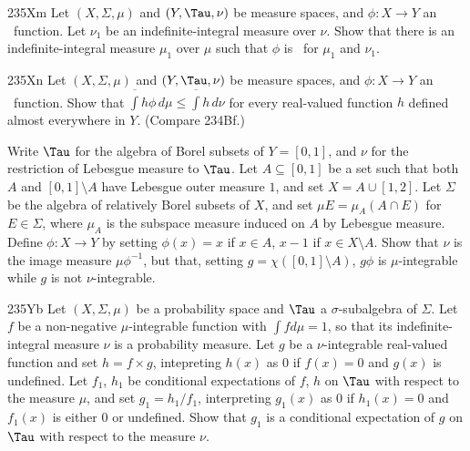 {\spheader 235Xm
 Let $(X,\Sigma,\mu)$ and $(Y,\Tau,\nu)$ be measure spaces,  
and $\phi:X\to Y$ an \imp\ function.   Let $\nu_1$ be an 
indefinite-integral measure over $\nu$.   Show that there is an 
indefinite-integral measure $\mu_1$ over $\mu$ such that $\phi$ is \imp\  
for $\mu_1$ and $\nu_1$. 

\spheader 235Xn  
Let $(X,\Sigma,\mu)$ and $(Y,\Tau,\nu)$ be 
measure spaces, and $\phi:X\to Y$ an \imp\ function.   Show that
$\overline{\int}h\phi\,d\mu\le\overline{\int}h\,d\nu$ for every
real-valued function $h$ defined almost everywhere in $Y$.
(Compare 234Bf.)

Write $\Tau$ for the algebra of Borel subsets of
$Y=[0,1]$, and $\nu$ for the restriction of Lebesgue measure to $\Tau$.
Let $A\subseteq[0,1]$ be a set such that both $A$ and $[0,1]\setminus A$
have Lebesgue outer measure $1$, and set $X=A\cup[1,2]$.   Let $\Sigma$
be the algebra of relatively Borel subsets of $X$, and set 
$\mu E=\mu_A(A\cap E)$ for $E\in\Sigma$, where $\mu_A$ is the subspace
measure induced on $A$ by Lebesgue measure.   Define $\phi:X\to Y$ by
setting $\phi(x)=x$ if $x\in A$, $x-1$ if $x\in X\setminus A$.   Show
that $\nu$ is the image measure $\mu\phi^{-1}$, but that,
setting $g=\chi([0,1]\setminus A)$, $g\phi$ is $\mu$-integrable while
$g$ is not $\nu$-integrable.

\spheader 235Yb Let $(X,\Sigma,\mu)$ be a probability space and $\Tau$ a
$\sigma$-subalgebra of $\Sigma$.   Let $f$ be a non-negative
$\mu$-integrable function with $\int fd\mu=1$, so that its
indefinite-integral measure $\nu$ is a probability measure.   Let $g$ be
a $\nu$-integrable real-valued function and set $h=f\times g$,
intepreting
$h(x)$ as $0$ if $f(x)=0$ and $g(x)$ is undefined.   Let $f_1$, $h_1$ be
conditional expectations of $f$, $h$ on $\Tau$ with respect to the
measure $\mu$, and set $g_1=h_1/f_1$, interpreting $g_1(x)$ as $0$ if
$h_1(x)=0$ and $f_1(x)$ is either $0$ or undefined.   Show that $g_1$ is
a conditional expectation of $g$ on $\Tau$ with respect to the measure
$\nu$.
}%

